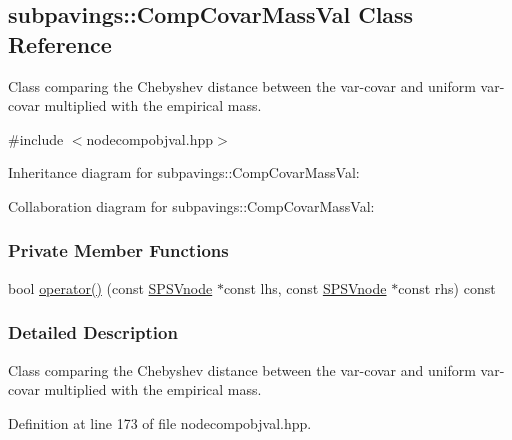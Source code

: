 \hypertarget{classsubpavings_1_1CompCovarMassVal}{\subsection{subpavings\-:\-:\-Comp\-Covar\-Mass\-Val \-Class \-Reference}
\label{classsubpavings_1_1CompCovarMassVal}
}


\-Class comparing the \-Chebyshev distance between the var-\/covar and uniform var-\/covar multiplied with the empirical mass.  




{\ttfamily \#include $<$nodecompobjval.\-hpp$>$}



\-Inheritance diagram for subpavings\-:\-:\-Comp\-Covar\-Mass\-Val\-:


\-Collaboration diagram for subpavings\-:\-:\-Comp\-Covar\-Mass\-Val\-:
\subsubsection*{\-Private \-Member \-Functions}
\begin{DoxyCompactItemize}
\item 
bool \hyperlink{classsubpavings_1_1CompCovarMassVal_a90678bb7b104b92c218a314a824506c1}{operator()} (const \hyperlink{classsubpavings_1_1SPSVnode}{\-S\-P\-S\-Vnode} $\ast$const lhs, const \hyperlink{classsubpavings_1_1SPSVnode}{\-S\-P\-S\-Vnode} $\ast$const rhs) const 
\end{DoxyCompactItemize}


\subsubsection{\-Detailed \-Description}
\-Class comparing the \-Chebyshev distance between the var-\/covar and uniform var-\/covar multiplied with the empirical mass. 

\-Definition at line 173 of file nodecompobjval.\-hpp.



